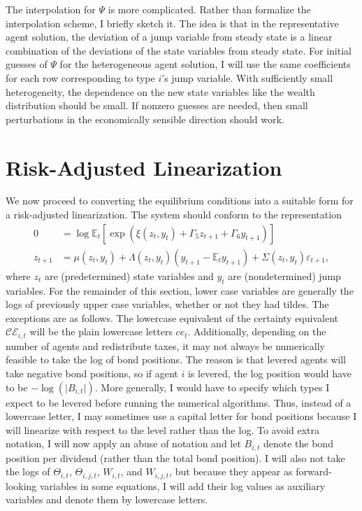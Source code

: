 \documentclass[12 pt, oneside]{article}
\theoremstyle{definition}
\theoremstyle{definition}
\theoremstyle{definition}
\newcommand{\E}{\mathbb{E}}
\newcommand{\calC}{\mathcal{C}}
\newcommand{\calE}{\mathcal{E}}
\begin{document}
The interpolation for $\Psi$ is more complicated. Rather than formalize the interpolation scheme, I briefly sketch it. The idea is that in the representative agent solution, the deviation of a jump variable from steady state is a linear combination of the deviations of the state variables from steady state. For initial guesses of $\Psi$ for the heterogeneous agent solution, I will use the same coefficients for each row corresponding to type $i$'s jump variable. With sufficiently small heterogeneity, the dependence on the new state variables like the wealth distribution should be small. If nonzero guesses are needed, then small perturbations in the economically sensible direction should work.

\section{Risk-Adjusted Linearization}\label{sec:ral}

We now proceed to converting the equilibrium conditions into a suitable form for a risk-adjusted linearization. The system should conform to the representation
\begin{align*}
  0 & = \log \E_t\left[\exp\left(\xi(z_t, y_t) + \Gamma_5 z_{t + 1} + \Gamma_6 y_{t + 1}\right)\right]\\
  z_{t + 1} & = \mu(z_t, y_t) + \Lambda(z_t, y_t) (y_{t + 1} - \E_t y_{t + 1}) + \Sigma(z_t, y_t) \varepsilon_{t + 1},
\end{align*}
where $z_t$ are (predetermined) state variables and $y_t$ are (nondetermined) jump variables.
For the remainder of this section, lower case variables are generally the logs of previously upper case variables, whether or not they had tildes. The exceptions are as follows. The lowercase equivalent of the certainty equivalent $\calC\calE_{i, t}$ will be the plain lowercase letters $ce_t$. Additionally, depending on the number of agents and redistribute taxes, it may not always be numerically feasible to take the log of bond positions. The reason is that levered agents will take negative bond positions, so if agent $i$ is levered, the log position would have to be $-\log(\vert B_{i, t}\vert)$. More generally, I would have to specify which types I expect to be levered before running the numerical algorithms. Thus, instead of a lowercase letter, I may sometimes use a capital letter for bond positions because I will linearize with respect to the level rather than the log. To avoid extra notation, I will now apply an abuse of notation and let $B_{i, t}$ denote the bond position per dividend (rather than the total bond position). I will also not take the logs of $\Theta_{i, t}$, $\Theta_{i, j, t}$, $W_{i, t}$, and $W_{i, j, t}$, but because they appear as forward-looking variables in some equations, I will add their log values as auxiliary variables and denote them by lowercase letters.
\end{document}
